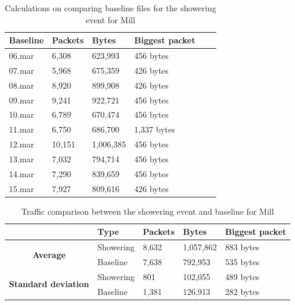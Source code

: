 \begin{table}[H]
    \centering
    \caption{Calculations on comparing baseline files for the showering event for Mill}
    \begin{tabular}{|l|l|l|l|l|l|}
    \hline
        \textbf{Baseline} & \textbf{Packets} & \textbf{Bytes} & \textbf{Biggest packet} \\ \hline
        06.mar & 6,308  & 623,993   & 456 bytes \\ \hline
        07.mar & 5,968  & 675,359   & 426 bytes \\ \hline
        08.mar & 8,920  & 899,908   & 426 bytes \\ \hline
        09.mar & 9,241  & 922,721   & 456 bytes \\ \hline
        10.mar & 6,789  & 670,474   & 456 bytes \\ \hline
        11.mar & 6,750  & 686,700   & 1,337 bytes \\ \hline
        12.mar & 10,151 & 1,006,385 & 456 bytes \\ \hline
        13.mar & 7,032  & 794,714   & 456 bytes \\ \hline
        14.mar & 7,290  & 839,659   & 456 bytes \\ \hline
        15.mar & 7,927  & 809,616   & 426 bytes \\ \hline
    \end{tabular}
    \label{tab:MillBaselineShowerCalculations}
\end{table}

\begin{table}[H]
    \centering
    \caption{Traffic comparison between the showering event and baseline for Mill}
    \begin{tabular}{c|l|l|l|l|}
        \cline{2-5}
        \multicolumn{1}{l|}{}                                              & \textbf{Type} & \textbf{Packets} & \textbf{Bytes} & \textbf{Biggest packet} \\ \hline
        \multicolumn{1}{|c|}{\multirow{2}{*}{\textbf{Average}}}            & Showering         & 8,632            & 1,057,862       & 883 bytes               \\ \cline{2-5} 
        \multicolumn{1}{|c|}{}                                             & Baseline      & 7,638            & 792,953         & 535 bytes                \\ \hline
        \multicolumn{1}{|c|}{\multirow{2}{*}{\textbf{Standard deviation}}} & Showering         & 801              & 102,055         & 489 bytes                 \\ \cline{2-5} 
        \multicolumn{1}{|c|}{}                                             & Baseline      & 1,381            & 126,913       
          &  282 bytes               \\ \hline          
    \end{tabular}
    \label{tab:MillComparingBaselineAndShowerCalculations}
\end{table}

